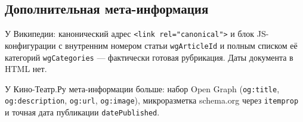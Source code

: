 \subsection*{Дополнительная мета-информация}

У Википедии: канонический адрес \texttt{<link rel="canonical">} и блок JS-конфигурации с
внутренним номером статьи \texttt{wgArticleId} и полным списком её категорий
\texttt{wgCategories} --- фактически готовая рубрикация. Даты документа в HTML нет.

У Кино-Театр.Ру мета-информации больше: набор Open Graph (\texttt{og:title},
\texttt{og:description}, \texttt{og:url}, \texttt{og:image}), микроразметка schema.org
через \texttt{itemprop} и точная дата публикации \texttt{datePublished}.

\pagebreak
